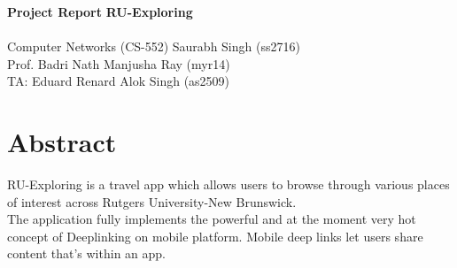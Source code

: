 \documentclass[a4paper, 11pt]{article}
\begin{document}
\noindent
\LARGE\textbf{Project Report} \hfill \textbf{RU-Exploring} \\ \\
\normalsize Computer Networks (CS-552) \hfill Saurabh Singh (ss2716)\\
Prof. Badri Nath \hfill Manjusha Ray (myr14)\\
\normalsize{TA: Eduard Renard} \hfill Alok Singh (as2509)

\section*{Abstract}
RU-Exploring is a travel app which allows users to browse through various places of interest across Rutgers University-New Brunswick.\\
The application fully implements the powerful and at the moment very hot concept of Deeplinking on mobile platform. Mobile deep links let users share content that's within an app.%
\end{document}

